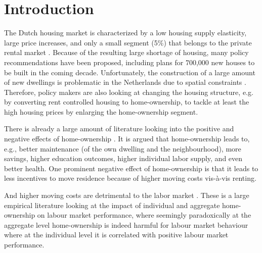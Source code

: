 \documentclass[fleqn,10pt]{SelfArx} %
\affiliation{\textsuperscript{1}\textit{Department of Spatial Economics, Vrije Universiteit Amsterdam, Amsterdam, The Netherlands}} %
\affiliation{*\textbf{Corresponding author}: \Letter{} t.de.graaff@vu.n; \Mundus{} \href{thomasdegraaff.nl}{thomasdegraaff.nl}} %
\begin{document}
	
	\flushbottom %
	\maketitle %
	\thispagestyle{empty} %
	
	
	\section{Introduction} %

        The Dutch housing market is characterized by a low housing supply
        elasticity, large price increases, and only a small segment (5\%) that
        belongs to the private rental market
        \citep{michielsen2017}. Because of the resulting large
        shortage of housing, many policy recommendations have been proposed,
        including plans for 700,000 new houses to be built in the coming
        decade. Unfortunately, the construction of a large amount of new
        dwellings is problematic in the Netherlands due to spatial constraints
        \citep{michielsen2019}. Therefore, policy makers are also looking at
        changing the housing structure, e.g. by converting rent controlled housing
        to home-ownership, to tackle at least the high housing prices by
        enlarging the home-ownership segment.

        There is already a large amount of literature looking into the positive
        and negative effects of home-ownership \citep[see for an
        overview][]{dietz2003social}. It is argued that home-ownership leads to,
        e.g., better maintenance (of the own dwelling and the neighbourhood),
        more savings, higher education outcomes, higher individual labor supply,
        and even better health. One prominent negative effect of home-ownership
        is that it leads to less incentives to move residence because of higher
        moving costs vis-\`{a}-vis renting.  
        
        And higher moving costs are detrimental to the labor market
        \citep{oswald1996conjecture, oswald1999housing}. These is a large
        empirical literature \citep[see, e.g., ][]{munch2006homeowners,
          munch2008home, de2013european} looking at the impact of individual and
        aggregate home-ownership on labour market performance, where seemingly
        paradoxically at the aggregate level home-ownership is indeed harmful
        for labour market behaviour where at the individual level it is
        correlated with positive labour market performance.
        
\end{document}
